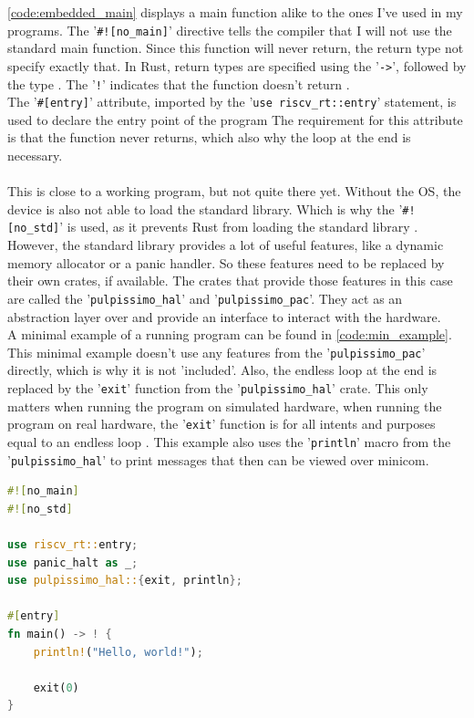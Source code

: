 \ref{code:embedded_main} displays a main function alike to the ones I've used in my programs.
The '\lstinline{#![no_main]}' directive tells the compiler that I will not use the standard main function.
Since this function will never return, the return type not specify exactly that.
In Rust, return types are specified using the '\lstinline{->}', followed by the type \cite{rust_return}.
The '\lstinline{!}' indicates that the function doesn't return \cite{rust_never_type}.
\\
The '\lstinline{#[entry]}' attribute, imported by the '\lstinline{use riscv_rt::entry}' statement, is used to declare the entry point of the program \cite{riscv_rt_entry}
The requirement for this attribute is that the function never returns, which also why the loop at the end is necessary.
\\\\
This is close to a working program, but not quite there yet.
Without the OS, the device is also not able to load the standard library.
Which is why the '\lstinline{#![no_std]}' is used, as it prevents Rust from loading the standard library \cite{rust_no_std}.
However, the standard library provides a lot of useful features, like a dynamic memory allocator or a panic handler.
So these features need to be replaced by their own crates, if available.
The crates that provide those features in this case are called the '\lstinline{pulpissimo_hal}' and '\lstinline{pulpissimo_pac}'.
They act as an abstraction layer over and provide an interface to interact with the hardware.
\\
A minimal example of a running program can be found in \ref{code:min_example}.
This minimal example doesn't use any features from the '\lstinline{pulpissimo_pac}' directly, which is why it is not 'included'.
Also, the endless loop at the end is replaced by the '\lstinline{exit}' function from the '\lstinline{pulpissimo_hal}' crate.
This only matters when running the program on simulated hardware, when running the program on real hardware, the '\lstinline{exit}' function is
for all intents and purposes equal to an endless loop \cite[Ch 4.3.10]{rust_pulp}.
This example also uses the '\lstinline{println}' macro from the '\lstinline{pulpissimo_hal}' to print messages that then can be viewed over minicom.

\begin{lstlisting}[style=colorEX,language=Rust,caption={Minimal example of a program running on the pulpissimo hardware},label={code:min_example}]
#![no_main]
#![no_std]

use riscv_rt::entry;
use panic_halt as _;
use pulpissimo_hal::{exit, println};

#[entry]
fn main() -> ! {
    println!("Hello, world!");

    exit(0)
}
\end{lstlisting}


